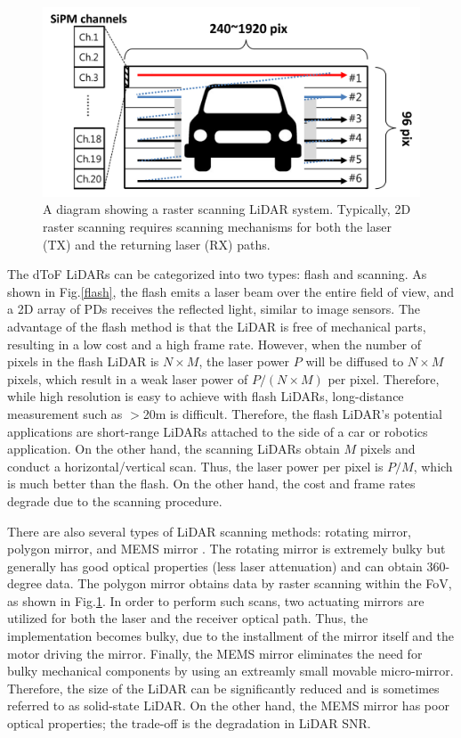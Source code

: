 \documentclass[paper]{ieice}
\begin{document}
\begin{figure}[!t]
\centering
 \includegraphics[width=0.5 \textwidth]{figs/raster.png}
  \caption{A diagram showing a raster scanning LiDAR system. Typically, 2D raster scanning requires scanning mechanisms for both the laser (TX) and the returning laser (RX) paths.}
\label{raster}
\end{figure}

The dToF LiDARs can be categorized into two types: flash \cite{ximenes2018256, padmanabhan20217, lindner2018252} and scanning. As shown in Fig.\ref{flash}, the flash emits a laser beam over the entire field of view, and a 2D array of PDs receives the reflected light, similar to image sensors. The advantage of the flash method is that the LiDAR is free of mechanical parts, resulting in a low cost and a high frame rate. However, when the number of pixels in the flash LiDAR is $N \times M$, the laser power $P$ will be diffused to $N \times M$ pixels, which result in a weak laser power of $P/(N \times M)$ per pixel. Therefore, while high resolution is easy to achieve with flash LiDARs, long-distance measurement such as $>$20m is difficult. Therefore, the flash LiDAR's potential applications are short-range LiDARs attached to the side of a car or robotics application. On the other hand, the scanning LiDARs obtain $M$ pixels and conduct a horizontal/vertical scan. Thus, the laser power per pixel is $P/M$, which is much better than the flash. On the other hand, the cost and frame rates degrade due to the scanning procedure.

There are also several types of LiDAR scanning methods: rotating mirror\cite{velodyne,ouster}, polygon mirror\cite{niclass2012100,yoshioka201820,kondo2020automotive}, and MEMS mirror \cite{ito2013system, akita2017imager, kumagai2021189x600}.  The rotating mirror is extremely bulky but generally has good optical properties (less laser attenuation) and can obtain 360-degree data.
The polygon mirror obtains data by raster scanning within the FoV, as shown in Fig.\ref{raster}. In order to perform such scans, two actuating mirrors are utilized for both the laser and the receiver optical path. Thus, the implementation becomes bulky, due to the installment of the mirror itself and the motor driving the mirror.
Finally, the MEMS mirror eliminates the need for bulky mechanical components by using an extreamly small movable micro-mirror. Therefore, the size of the LiDAR can be significantly reduced and is sometimes referred to as solid-state LiDAR. On the other hand, the MEMS mirror has poor optical properties; the trade-off is the degradation in LiDAR SNR.
\end{document}
